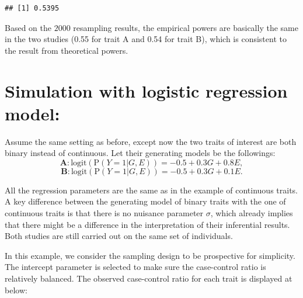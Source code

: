 \documentclass[
]{article}
\begin{document}
\begin{verbatim}
## [1] 0.5395
\end{verbatim}

Based on the \(2000\) resampling results, the empirical powers are
basically the same in the two studies (0.55 for trait A and 0.54 for
trait B), which is consistent to the result from theoretical powers.

\hypertarget{simulation-with-logistic-regression-model}{%
\section{Simulation with logistic regression
model:}\label{simulation-with-logistic-regression-model}}

Assume the same setting as before, except now the two traits of interest
are both binary instead of continuous. Let their generating models be
the followings:
\[\textbf{A}:\text{logit}(\text{P}(Y=1|G,E)) = -0.5 + 0.3G + 0.8E,\]
\[\textbf{B}: \text{logit}(\text{P}(Y=1|G,E)) = -0.5 + 0.3G + 0.1E.\]

All the regression parameters are the same as in the example of
continuous traits. A key difference between the generating model of
binary traits with the one of continuous traits is that there is no
nuisance parameter \(\sigma\), which already implies that there might be
a difference in the interpretation of their inferential results. Both
studies are still carried out on the same set of individuals.

In this example, we consider the sampling design to be prospective for
simplicity. The intercept parameter is selected to make sure the
case-control ratio is relatively balanced. The observed case-control
ratio for each trait is displayed at below:
\end{document}
